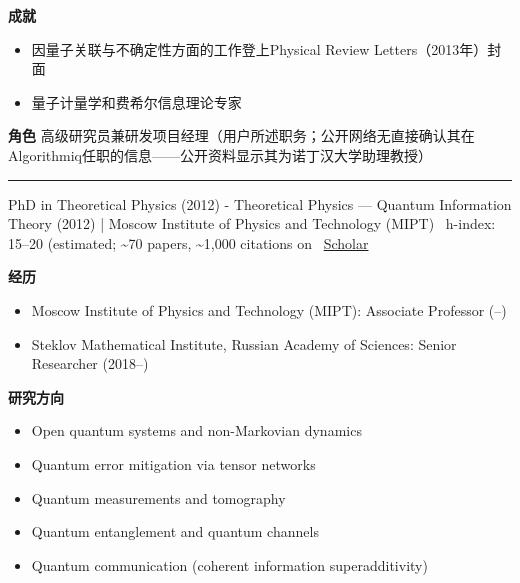 \par{\footnotesize\color{mainred}\textbf{成就}}
\begin{itemize}[leftmargin=1.2em,itemsep=0pt,topsep=0pt]
\item {\footnotesize 因量子关联与不确定性方面的工作登上Physical Review Letters（2013年）封面}
\item {\footnotesize 量子计量学和费希尔信息理论专家}
\end{itemize}
\par{\footnotesize\color{mainred}\textbf{角色}} {\footnotesize 高级研究员兼研发项目经理（用户所述职务；公开网络无直接确认其在Algorithmiq任职的信息——公开资料显示其为诺丁汉大学助理教授）}
\vspace{2pt}\hrule\vspace{2pt}
\vspace{4pt}
\par{\footnotesize\color{graytext}PhD in Theoretical Physics (2012) - Theoretical Physics — Quantum Information Theory (2012) | Moscow Institute of Physics and Technology (MIPT) \textbar\  h-index: 15–20 (estimated; \textasciitilde{}70 papers, \textasciitilde{}1,000 citations on  \textbar\  \href{https://scholar.google.com/citations?user=AimFBr8AAAAJ&hl=en}{Scholar}}
\par{\footnotesize\color{mainred}\textbf{经历}}
\begin{itemize}[leftmargin=1.2em,itemsep=0pt,topsep=0pt]
\item {\footnotesize Moscow Institute of Physics and Technology (MIPT): Associate Professor (–)}
\item {\footnotesize Steklov Mathematical Institute, Russian Academy of Sciences: Senior Researcher (2018–)}
\end{itemize}
\par{\footnotesize\color{mainred}\textbf{研究方向}}
\begin{itemize}[leftmargin=1.2em,itemsep=0pt,topsep=0pt]
\item {\footnotesize Open quantum systems and non-Markovian dynamics}
\item {\footnotesize Quantum error mitigation via tensor networks}
\item {\footnotesize Quantum measurements and tomography}
\item {\footnotesize Quantum entanglement and quantum channels}
\item {\footnotesize Quantum communication (coherent information superadditivity)}
\end{itemize}
